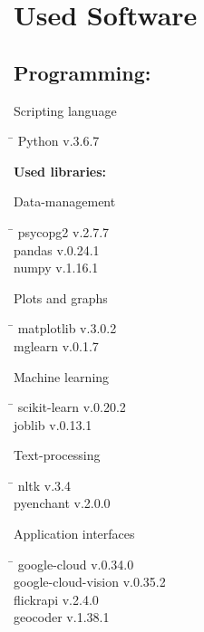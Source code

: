 \chapter*{Used Software}

\section*{Programming:}
\begin{large}Scripting language\end{large}
\begin{tabbing}
 \hspace*{5cm}  \= \kill
 Python \> v.3.6.7
\end{tabbing}
\textbf{Used libraries:}\\
\newline
\begin{large}Data-management\end{large}
\begin{tabbing}
 \hspace*{5cm}  \= \kill
 psycopg2 \> v.2.7.7 \\
 pandas \> v.0.24.1 \\
 numpy \> v.1.16.1
 \end{tabbing}
\begin{large}Plots and graphs\end{large}
\begin{tabbing}
  \hspace*{5cm}  \= \kill
  matplotlib \> v.3.0.2 \\
  mglearn \> v.0.1.7
 \end{tabbing}
\begin{large}Machine learning\end{large}
 \begin{tabbing}
  \hspace*{5cm}  \= \kill
  scikit-learn \> v.0.20.2 \\
  joblib \> v.0.13.1
 \end{tabbing}
\begin{large}Text-processing\end{large}
 \begin{tabbing}
  \hspace*{5cm}  \= \kill
   nltk \> v.3.4 \\
   pyenchant \> v.2.0.0
  \end{tabbing}
 \begin{large}Application interfaces\end{large}
 \begin{tabbing}
  \hspace*{5cm}  \= \kill
  google-cloud \> v.0.34.0 \\
  google-cloud-vision \> v.0.35.2 \\
  flickrapi \> v.2.4.0 \\
  geocoder \> v.1.38.1
 \end{tabbing}

